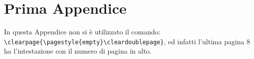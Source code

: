 \documentclass[12pt,a4paper,openright,twoside]{report}
\renewcommand{\chaptermark}[1]{\markboth{\thechapter.\ #1}{}}
\begin{document}
\renewcommand{\chaptermark}[1]{\markright{\thechapter \ #1}{}}
\lhead[\fancyplain{}{\bfseries\thepage}]{\fancyplain{}{\bfseries\rightmark}}
\appendix                               %
\chapter{Prima Appendice}               %
In questa Appendice non si \`e utilizzato il comando:\\
\verb"\clearpage{\pagestyle{empty}\cleardoublepage}", ed infatti
l'ultima pagina 8 ha l'intestazione con il numero di pagina in
alto.
\end{document}
